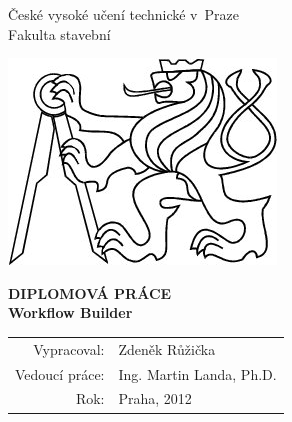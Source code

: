 \def \CVUT {České vysoké učení technické v~Praze}
\def \FSV {Fakulta stavební}
\def \KATEDRA {Katedra mapování a kartografie}
\def \BookName {DIPLOMOVÁ PRÁCE}
\def \Bookname {Workflow Builder}
\def \Authors {Zdeněk Růžička}
\def \DatumDP {Praha, 2012}
\newcommand{\vedouci}{Ing. Martin Landa, Ph.D.}

\def \BookHeadDP {
    \begin{center}
    {\LARGE \textsc \CVUT}\\[2ex]
    {\LARGE \textsc \FSV}\\

    \vspace{2cm}
	\begin{center}
		\includegraphics[scale=0.55]{pictures/lev}
	\end{center}
    \vspace{1cm}

    {\textbf {\Huge \BookName \\[4ex]}
    {\LARGE \bf \Bookname}
    }

   \vfill
   {\large
    \begin{tabular}{rl}
    Vypracoval: & \Authors\\
    Vedoucí práce: & \vedouci\\
    Rok: & \DatumDP
    \end{tabular}
   }

    \newpage
    \end{center}
}
\pagestyle{empty}                       %
\BookHeadDP
\cleardoublepage


